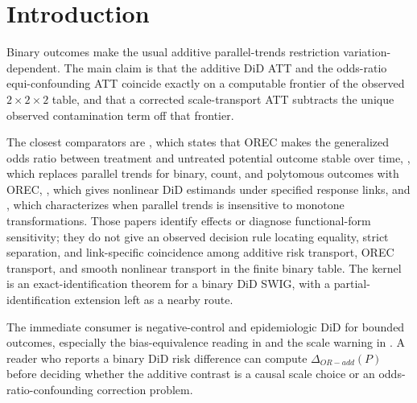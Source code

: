 \documentclass[11pt]{article}
\theoremstyle{definition}
\theoremstyle{plain}
\theoremstyle{remark}
\begin{document}
\section{Introduction}
Binary outcomes make the usual additive parallel-trends restriction variation-dependent.  The main claim is that the additive DiD ATT and the odds-ratio equi-confounding ATT coincide exactly on a computable frontier of the observed \(2\times2\times2\) table, and that a corrected scale-transport ATT subtracts the unique observed contamination term off that frontier.

The closest comparators are \citet[Abstract and Sec. 2]{ParkTchetgenTchetgen2022}, which states that OREC makes the generalized odds ratio between treatment and untreated potential outcome stable over time, \citet[Abstract and Sec. 2]{TchetgenTchetgenParkRichardson2024}, which replaces parallel trends for binary, count, and polytomous outcomes with OREC, \citet[Sec. 2]{Wooldridge2023}, which gives nonlinear DiD estimands under specified response links, and \citet[Theorem 1 and Sec. 3]{RothSantAnna2023}, which characterizes when parallel trends is insensitive to monotone transformations.  Those papers identify effects or diagnose functional-form sensitivity; they do not give an observed decision rule locating equality, strict separation, and link-specific coincidence among additive risk transport, OREC transport, and smooth nonlinear transport in the finite binary table.  The kernel is an exact-identification theorem for a binary DiD SWIG, with a partial-identification extension left as a nearby route.

The immediate consumer is negative-control and epidemiologic DiD for bounded outcomes, especially the bias-equivalence reading in \citet{SoferRichardsonColicinoSchwartzTchetgen2016} and the scale warning in \citet{TchetgenTchetgen2014}.  A reader who reports a binary DiD risk difference can compute \(\Delta_{OR-add}(P)\) before deciding whether the additive contrast is a causal scale choice or an odds-ratio-confounding correction problem.
\end{document}
